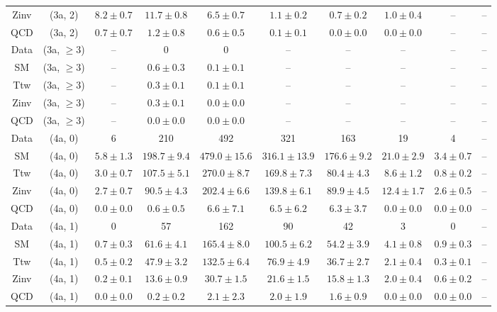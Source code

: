 \begin{table}[h!]
{\begin{tabular}{cccccccccc}
	Zinv & (3a, 2) & $8.2\pm 0.7$ & $11.7\pm 0.8$ & $6.5\pm 0.7$ & $1.1\pm 0.2$ & $0.7\pm 0.2$ & $1.0\pm 0.4$ & -- & -- \\[0.5ex] 
	QCD & (3a, 2) & $0.7\pm 0.7$ & $1.2\pm 0.8$ & $0.6\pm 0.5$ & $0.1\pm 0.1$ & $0.0\pm 0.0$ & $0.0\pm 0.0$ & -- & -- \\[0.5ex] 
	Data & (3a, $\ge3$) & -- & 0 & 0 & -- & -- & -- & -- & -- \\[0.5ex] 
	SM & (3a, $\ge3$) & -- & $0.6\pm 0.3$ & $0.1\pm 0.1$ & -- & -- & -- & -- & -- \\[0.5ex] 
	Ttw & (3a, $\ge3$) & -- & $0.3\pm 0.1$ & $0.1\pm 0.1$ & -- & -- & -- & -- & -- \\[0.5ex] 
	Zinv & (3a, $\ge3$) & -- & $0.3\pm 0.1$ & $0.0\pm 0.0$ & -- & -- & -- & -- & -- \\[0.5ex] 
	QCD & (3a, $\ge3$) & -- & $0.0\pm 0.0$ & $0.0\pm 0.0$ & -- & -- & -- & -- & -- \\[0.5ex] 
	Data & (4a, 0) & 6 & 210 & 492 & 321 & 163 & 19 & 4 & -- \\[0.5ex] 
	SM & (4a, 0) & $5.8\pm 1.3$ & $198.7\pm 9.4$ & $479.0\pm 15.6$ & $316.1\pm 13.9$ & $176.6\pm 9.2$ & $21.0\pm 2.9$ & $3.4\pm 0.7$ & -- \\[0.5ex] 
	Ttw & (4a, 0) & $3.0\pm 0.7$ & $107.5\pm 5.1$ & $270.0\pm 8.7$ & $169.8\pm 7.3$ & $80.4\pm 4.3$ & $8.6\pm 1.2$ & $0.8\pm 0.2$ & -- \\[0.5ex] 
	Zinv & (4a, 0) & $2.7\pm 0.7$ & $90.5\pm 4.3$ & $202.4\pm 6.6$ & $139.8\pm 6.1$ & $89.9\pm 4.5$ & $12.4\pm 1.7$ & $2.6\pm 0.5$ & -- \\[0.5ex] 
	QCD & (4a, 0) & $0.0\pm 0.0$ & $0.6\pm 0.5$ & $6.6\pm 7.1$ & $6.5\pm 6.2$ & $6.3\pm 3.7$ & $0.0\pm 0.0$ & $0.0\pm 0.0$ & -- \\[0.5ex] 
	Data & (4a, 1) & 0 & 57 & 162 & 90 & 42 & 3 & 0 & -- \\[0.5ex] 
	SM & (4a, 1) & $0.7\pm 0.3$ & $61.6\pm 4.1$ & $165.4\pm 8.0$ & $100.5\pm 6.2$ & $54.2\pm 3.9$ & $4.1\pm 0.8$ & $0.9\pm 0.3$ & -- \\[0.5ex] 
	Ttw & (4a, 1) & $0.5\pm 0.2$ & $47.9\pm 3.2$ & $132.5\pm 6.4$ & $76.9\pm 4.9$ & $36.7\pm 2.7$ & $2.1\pm 0.4$ & $0.3\pm 0.1$ & -- \\[0.5ex] 
	Zinv & (4a, 1) & $0.2\pm 0.1$ & $13.6\pm 0.9$ & $30.7\pm 1.5$ & $21.6\pm 1.5$ & $15.8\pm 1.3$ & $2.0\pm 0.4$ & $0.6\pm 0.2$ & -- \\[0.5ex] 
	QCD & (4a, 1) & $0.0\pm 0.0$ & $0.2\pm 0.2$ & $2.1\pm 2.3$ & $2.0\pm 1.9$ & $1.6\pm 0.9$ & $0.0\pm 0.0$ & $0.0\pm 0.0$ & -- \\[0.5ex] 

\end{tabular}}
\end{table}
